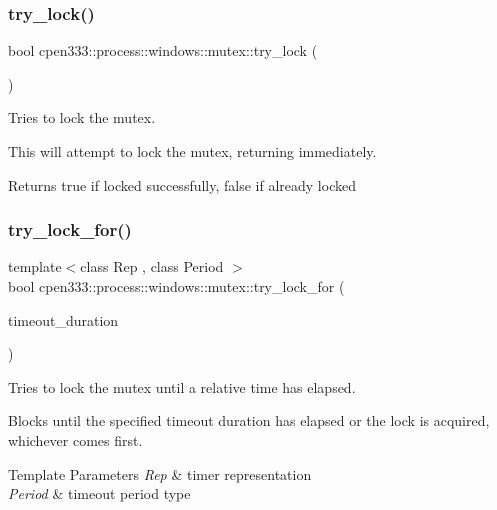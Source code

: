 \subsubsection{\texorpdfstring{try\+\_\+lock()}{try\_lock()}}
{\footnotesize\ttfamily bool cpen333\+::process\+::windows\+::mutex\+::try\+\_\+lock (\begin{DoxyParamCaption}{ }\end{DoxyParamCaption})\hspace{0.3cm}{\ttfamily [inline]}}



Tries to lock the mutex. 

This will attempt to lock the mutex, returning immediately.

\begin{DoxyReturn}{Returns}
true if locked successfully, false if already locked 
\end{DoxyReturn}
\mbox{\label{classcpen333_1_1process_1_1windows_1_1mutex_aa6a64c60b601c226648cce293835c802}} 
\subsubsection{\texorpdfstring{try\+\_\+lock\+\_\+for()}{try\_lock\_for()}}
{\footnotesize\ttfamily template$<$class Rep , class Period $>$ \\
bool cpen333\+::process\+::windows\+::mutex\+::try\+\_\+lock\+\_\+for (\begin{DoxyParamCaption}\item[{const std\+::chrono\+::duration$<$ Rep, Period $>$ \&}]{timeout\+\_\+duration }\end{DoxyParamCaption})\hspace{0.3cm}{\ttfamily [inline]}}



Tries to lock the mutex until a relative time has elapsed. 

Blocks until the specified timeout duration has elapsed or the lock is acquired, whichever comes first.


\begin{DoxyTemplParams}{Template Parameters}
{\em Rep} & timer representation \\
\hline
{\em Period} & timeout period type \\
\hline
\end{DoxyTemplParams}

